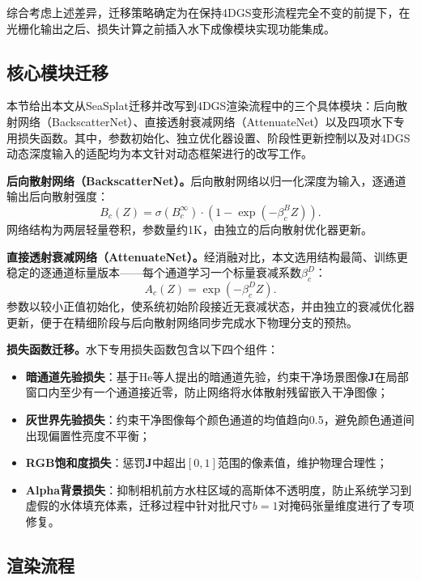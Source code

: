 综合考虑上述差异，迁移策略确定为在保持4DGS变形流程完全不变的前提下，在光栅化输出之后、损失计算之前插入水下成像模块实现功能集成。

\subsection{核心模块迁移}

本节给出本文从SeaSplat迁移并改写到4DGS渲染流程中的三个具体模块：后向散射网络（BackscatterNet）、直接透射衰减网络（AttenuateNet）以及四项水下专用损失函数。其中，参数初始化、独立优化器设置、阶段性更新控制以及对4DGS动态深度输入的适配均为本文针对动态框架进行的改写工作。

\textbf{后向散射网络（BackscatterNet）。}后向散射网络以归一化深度为输入，逐通道输出后向散射强度：
\begin{equation}
  B_c(Z) = \sigma(B_c^{\infty}) \cdot \left(1 - \exp(-\beta_c^B Z)\right).
  \label{eq:backscatter_impl}
\end{equation}网络结构为两层轻量卷积，参数量约1K，由独立的后向散射优化器更新。

\textbf{直接透射衰减网络（AttenuateNet）。}经消融对比，本文选用结构最简、训练更稳定的逐通道标量版本——每个通道学习一个标量衰减系数$\beta_c^D$：
\begin{equation}
  A_c(Z) = \exp\!\left(-\beta_c^D Z\right).
  \label{eq:attenuation_impl}
\end{equation}参数以较小正值初始化，使系统初始阶段接近无衰减状态，并由独立的衰减优化器更新，便于在精细阶段与后向散射网络同步完成水下物理分支的预热。

\textbf{损失函数迁移。}水下专用损失函数包含以下四个组件：

\begin{itemize}
  \item \textbf{暗通道先验损失}：基于He等人提出的暗通道先验，约束干净场景图像$\mathbf{J}$在局部窗口内至少有一个通道接近零，防止网络将水体散射残留嵌入干净图像；
  \item \textbf{灰世界先验损失}：约束干净图像每个颜色通道的均值趋向0.5，避免颜色通道间出现偏置性亮度不平衡；
  \item \textbf{RGB饱和度损失}：惩罚$\mathbf{J}$中超出$[0,1]$范围的像素值，维护物理合理性；
  \item \textbf{Alpha背景损失}：抑制相机前方水柱区域的高斯体不透明度，防止系统学习到虚假的水体填充体素，迁移过程中针对批尺寸$b=1$对掩码张量维度进行了专项修复。
\end{itemize}

\subsection{渲染流程}

